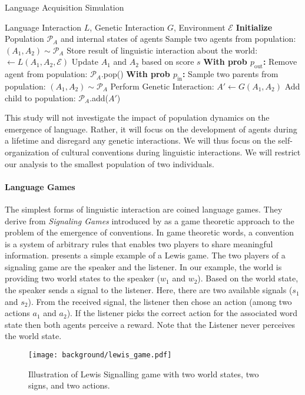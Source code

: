 \begin{algorithm}[!h]
    \begin{algorithmic}
    \small
        \caption{\label{alg:langage-acquisition}Language Acquisition Simulation}
        \REQUIRE Language Interaction $L$, Genetic Interaction $G$, Environment $\mathcal{E}$
        \STATE \textbf{Initialize} Population $\mathcal{P}_A$ and internal states of agents 
		\LOOP
        \STATE Sample two agents from population: $(A_1,A_2) \sim \mathcal{P}_A$ 
        \STATE Store result of linguistic interaction about the world: $ \leftarrow L(A_1,A_2,\mathcal{E})$
        \STATE Update $A_1$ and $A_2$ based on score $s$
        \STATE \textbf{With prob $p_{\text{out}}$:}
        \bindent
        \STATE Remove agent from population: $\mathcal{P}_A$.pop()
        \eindent
        \STATE \textbf{With prob $p_{\text{in}}$:}
        \bindent
        \STATE Sample two parents from population: $(A_1,A_2) \sim \mathcal{P}_A$  
        \STATE Perform Genetic Interaction: $A' \leftarrow G(A_1,A_2)$
        \STATE Add child to population: $\mathcal{P}_A$.add($A'$)
        \eindent
        \ENDLOOP
    \end{algorithmic}
\end{algorithm}

This study will not investigate the impact of population dynamics on the emergence of language. Rather, it will focus on the development of agents during a lifetime and disregard any genetic interactions. We will thus focus on the self-organization of cultural conventions during linguistic interactions. We will restrict our analysis to the smallest population of two individuals. 

\newpage
\paragraph{Language Games}

The simplest forms of linguistic interaction are coined language games. They derive from \textit{Signaling Games} introduced by \citet{Lewis1969} as a game theoretic approach to the problem of the emergence of conventions. In game theoretic words, a convention is a system of arbitrary rules that enables two players to share meaningful information.   presents a simple example of a Lewis game. The two players of a signaling game are the speaker and the listener. In our example, the world is providing two world states to the speaker ($w_1$ and $w_2$). Based on the world state, the speaker sends a signal to the listener. Here, there are two available signals ($s_1$ and $s_2$). From the received signal, the listener then chose an action (among two actions $a_1$ and $a_2$). If the listener picks the correct action for the associated word state then both agents perceive a reward. Note that the Listener never perceives the world state.  
\begin{figure}[!h]
\centering
\texttt{[image: background/lewis\_game.pdf]}
\caption{Illustration of Lewis Signalling game with two world states, two signs, and two actions.}
\label{fig:lewis_game}
\end{figure}

